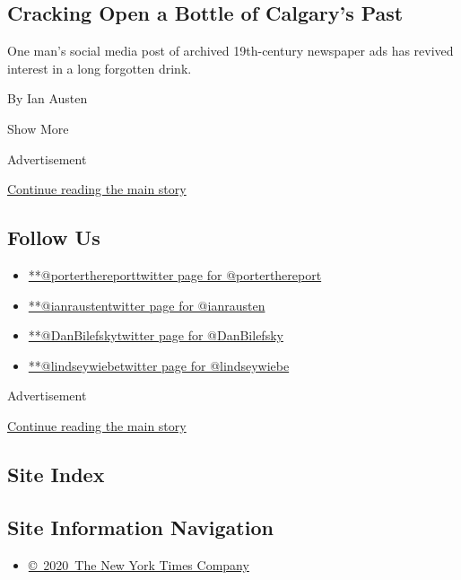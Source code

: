 \begin{enumerate}
  \hypertarget{cracking-open-a-bottle-of-calgarys-past}{%
  \subsection{Cracking Open a Bottle of Calgary's
  Past}\label{cracking-open-a-bottle-of-calgarys-past}}

  One man's social media post of archived 19th-century newspaper ads has
  revived interest in a long forgotten drink.

  By Ian Austen
\end{enumerate}

Show More

Advertisement

\protect\hyperlink{after-mid1}{Continue reading the main story}

\hypertarget{follow-us}{%
\subsection{Follow Us}\label{follow-us}}

\begin{itemize}
\tightlist
\item
  \href{https://twitter.com/porterthereport}{**@porterthereporttwitter
  page for @porterthereport}
\item
  \href{https://twitter.com/ianrausten}{**@ianraustentwitter page for
  @ianrausten}
\item
  \href{https://twitter.com/DanBilefsky}{**@DanBilefskytwitter page for
  @DanBilefsky}
\item
  \href{https://twitter.com/lindseywiebe}{**@lindseywiebetwitter page
  for @lindseywiebe}
\end{itemize}

Advertisement

\protect\hyperlink{after-mktg}{Continue reading the main story}

\hypertarget{site-index}{%
\subsection{Site Index}\label{site-index}}

\hypertarget{site-information-navigation}{%
\subsection{Site Information
Navigation}\label{site-information-navigation}}

\begin{itemize}
\tightlist
\item
  \href{https://help.nytimes3xbfgragh.onion/hc/en-us/articles/115014792127-Copyright-notice}{©~2020~The
  New York Times Company}
\end{itemize}

